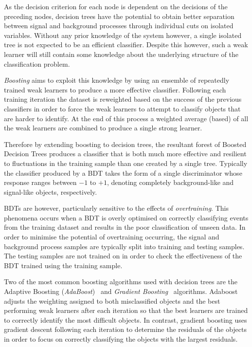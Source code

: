 As the decision criterion for each node is dependent on the decisions of the preceding nodes, decision trees have the potential to obtain better separation between signal and background processes through individual cuts on isolated variables.
Without any prior knowledge of the system however, a single isolated tree is not expected to be an efficient classifier.
Despite this however, such a weak learner will still contain some knowledge about the underlying structure of the classification problem.

\emph{Boosting} aims to exploit this knowledge by using an ensemble of repeatedly trained weak learners to produce a more effective classifier.
Following each training iteration the dataset is reweighted based on the success of the previous classifiers in order to force the weak learners to attempt to classify objects that are harder to identify.
At the end of this process a weighted average (based) of all the weak learners are combined to produce a single strong learner.

Therefore by extending boosting to decision trees, the resultant forest of Boosted Decision Trees produces a classifier that is both much more effective and resilient to fluctuations in the training sample than one created by a single tree.
Typically the classifier produced by a BDT takes the form of a single discriminator whose response ranges between $-1$ to $+1$, denoting completely background-like and signal-like objects, respectively.

BDTs are however, particularly sensitive to the effects of \emph{overtraining}.
This phenomena occurs when a BDT is overly optimised on correctly classifying events from the training dataset and results in the poor classification of unseen data.
In order to minimise the potential of overtraining occurring, the signal and background process samples are typically split into training and testing samples.
The testing samples are not trained on in order to check the effectiveness of the BDT trained using the training sample.

Two of the most common boosting algorithms used with decision trees are the Adaptive Boosting (\emph{AdaBoost})~\cite{Friedman:additivelogistic} and \emph{Gradient Boosting}~\cite{Friedman:greedyfunction,Friedman:GradientBoosting} algorithms.
Adaboost adjusts the weighting assigned to both  misclassified objects and the best performing weak learners after each iteration so that the best learners are trained to correctly identify the most difficult objects.
In contrast, gradient boosting uses gradient descent following each iteration to determine the residuals of the objects in order to focus on correctly classifying the objects with the largest residuals.

